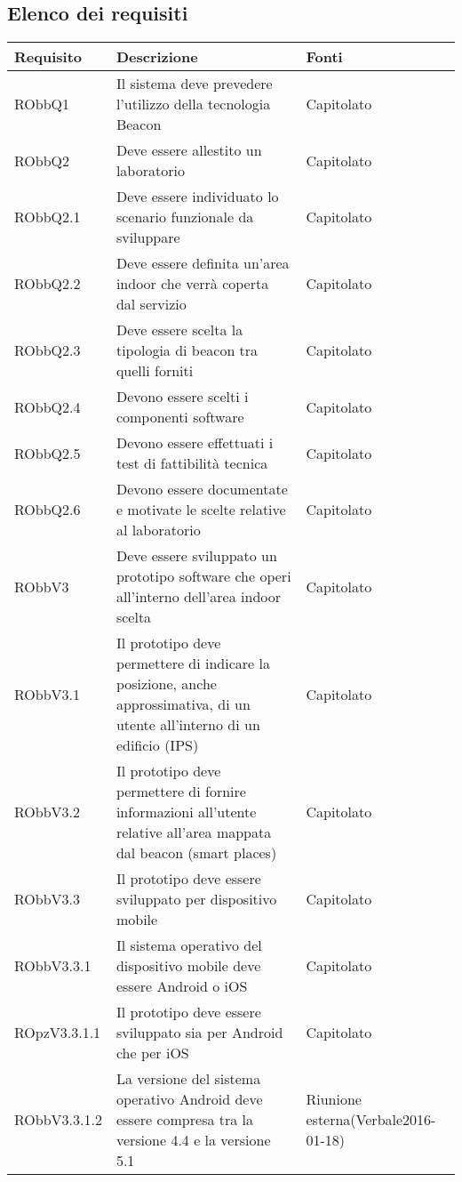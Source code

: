 \documentclass[../AnalisiDeiRequisiti.tex]{subfiles}
\begin{document}
	\subsection{Elenco dei requisiti}
		\begin{longtabu} to \textwidth {X X[2] X}
		\toprule
		\textbf{Requisito} & \textbf{Descrizione} & \textbf{Fonti}\\
		\midrule
		\endhead
		RObbQ1 & Il sistema deve prevedere l'utilizzo della tecnologia Beacon & Capitolato \\ 
		\midrule 
		RObbQ2 & Deve essere allestito un laboratorio & Capitolato \\ 
		\midrule 
		RObbQ2.1 & Deve essere individuato lo scenario funzionale da sviluppare & Capitolato \\ 
		\midrule 
		RObbQ2.2 & Deve essere definita un'area indoor che verrà coperta dal servizio & Capitolato \\ 
		\midrule 
		RObbQ2.3 & Deve essere scelta la tipologia di beacon tra quelli forniti & Capitolato \\ 
		\midrule 
		RObbQ2.4 & Devono essere scelti i componenti software & Capitolato \\ 
		\midrule 
		RObbQ2.5 & Devono essere effettuati i test di fattibilità tecnica & Capitolato \\ 
		\midrule 
		RObbQ2.6 & Devono essere documentate e motivate le scelte relative al laboratorio & Capitolato \\ 
		\midrule 
		RObbV3 & Deve essere sviluppato un prototipo software che operi all'interno dell'area indoor scelta & Capitolato \\ 
		\midrule 
		RObbV3.1 & Il prototipo deve permettere di indicare la posizione, anche approssimativa, di un utente all'interno di un edificio (IPS) & Capitolato \\ 
		\midrule 
		RObbV3.2 & Il prototipo deve permettere di fornire informazioni all'utente relative all'area mappata dal beacon (smart places) & Capitolato \\ 
		\midrule 
		RObbV3.3 & Il prototipo deve essere sviluppato per dispositivo mobile & Capitolato \\ 
		\midrule 
		RObbV3.3.1 & Il sistema operativo del dispositivo mobile deve essere Android o iOS & Capitolato \\ 
		\midrule 
		ROpzV3.3.1.1 & Il prototipo deve essere sviluppato sia per Android che per iOS & Capitolato \\ 
		\midrule 
		RObbV3.3.1.2 & La versione del sistema operativo Android deve essere compresa tra la versione 4.4 e la versione 5.1 & Riunione esterna(Verbale2016-01-18) \\ 

\end{longtabu}
\end{document}
